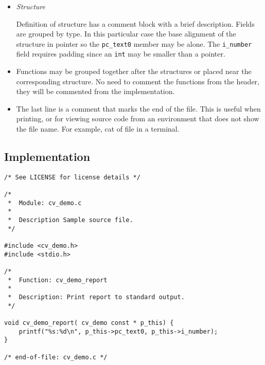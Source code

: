 \begin{itemize}
\item \emph{Structure}

    Definition of structure has a comment block with a brief description.
    Fields are grouped by type.  In this particular case the base alignment
    of the structure in pointer so the \texttt{pc\_text0} member may be
        alone.  The \texttt{i\_number} field requires padding since an
        \texttt{int} may be smaller than a pointer.

\item Functions may be grouped together after the structures or placed near
    the corresponding structure.  No need to comment the functions from
        the header, they will be commented from the implementation.

\item The last line is a comment that marks the end of the file.  This is
    useful when printing, or for viewing source code from an environment that
        does not show the file name.  For example, cat of file in a terminal.

\end{itemize}

\subsection{Implementation}

\begin{lstlisting}[caption={cv\_demo.c}]
/* See LICENSE for license details */

/*
 *  Module: cv_demo.c
 *
 *  Description Sample source file.
 */

#include <cv_demo.h>
#include <stdio.h>

/*
 *  Function: cv_demo_report
 *
 *  Description: Print report to standard output.
 */

void cv_demo_report( cv_demo const * p_this) {
    printf("%s:%d\n", p_this->pc_text0, p_this->i_number);
}

/* end-of-file: cv_demo.c */
\end{lstlisting}


